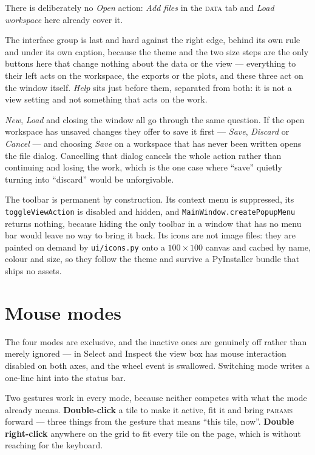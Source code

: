 \documentclass[11pt,a4paper,oneside]{report}
\newcommand{\code}[1]{\texttt{#1}}
\newcommand{\key}[1]{\textsf{\small\fbox{#1}}}
\newcommand{\tab}[1]{\textsc{#1}}
\begin{document}
There is deliberately no \emph{Open} action: \emph{Add files} in the \tab{data}
tab and \emph{Load workspace} here already cover it.

The interface group is last and hard against the right edge, behind its own
rule and under its own caption, because the theme and the two size steps are
the only buttons here that change nothing about the data or the view ---
everything to their left acts on the workspace, the exports or the plots, and
these three act on the window itself. \emph{Help} sits just before them,
separated from both: it is not a view setting and not something that acts on
the work.

\emph{New}, \emph{Load} and closing the window all go through the same
question. If the open workspace has unsaved changes they offer to save it
first --- \emph{Save}, \emph{Discard} or \emph{Cancel} --- and choosing
\emph{Save} on a workspace that has never been written opens the file dialog.
Cancelling that dialog cancels the whole action rather than continuing and
losing the work, which is the one case where ``save'' quietly turning into
``discard'' would be unforgivable.

The toolbar is permanent by construction. Its context menu is suppressed, its
\code{toggleViewAction} is disabled and hidden, and
\code{MainWindow.createPopupMenu} returns nothing, because hiding the only
toolbar in a window that has no menu bar would leave no way to bring it back.
Its icons are not image files: they are painted on demand by
\code{ui/icons.py} onto a $100\times100$ canvas and cached by name, colour and
size, so they follow the theme and survive a PyInstaller bundle that ships no
assets.

\section{Mouse modes}

The four modes are exclusive, and the inactive ones are genuinely off rather
than merely ignored --- in Select and Inspect the view box has mouse interaction
disabled on both axes, and the wheel event is swallowed. Switching mode writes a
one-line hint into the status bar.

Two gestures work in every mode, because neither competes with what the mode
already means. \textbf{Double-click} a tile to make it active, fit it and
bring \tab{params} forward --- three things from the gesture that means ``this
tile, now''. \textbf{Double right-click} anywhere on the grid to fit every
tile on the page, which is \key{Ctrl+0} without reaching for the keyboard.
\end{document}

